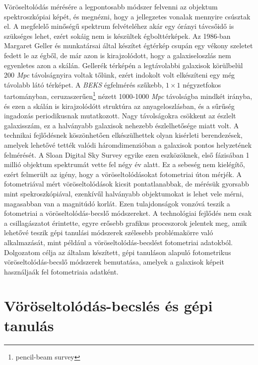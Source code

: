 \documentclass[12pt,letterpaper,twoside,openright]{book}
\begin{document}
Vöröseltolódás mérésére a legpontosabb módszer felvenni az objektum spektroszkópiai képét, és megnézni, hogy a jellegzetes vonalak mennyire csúsztak el. A megfelelő minőségű spektrum felvételéhez akár egy órányi távcsőidő is szükséges lehet, ezért sokáig nem is készültek égbolttérképek. Az 1986-ban Margaret Geller és munkatársai által készítet égtérkép csupán egy vékony szeletet fedett le az égből, de már azon is kirajzolódott, hogy a galaxiseloszlás nem egyenletes azon a skálán. Gellerék térképén a legtávolabbi galaxisok körülbelül 200 \textit{Mpc} távolságnyira voltak tőlünk, ezért indokolt volt elkészíteni egy még távolabb látó térképet. A \textit{BEKS} égfelmérés szűkebb, $1\times 1$ négyzetfokos tartományban, ceruzaszerűen\footnote{pencil-beam survey} nézett 1000-1000 \textit{Mpc} távolságba mindkét irányba, és ezen a skálán is kirajzolódótt struktúra az anyageloszlásban, és a sűrűség ingadozás periodikusnak mutatkozott. Nagy távolságokra csökkent az észlelt galaxisszám, ez a halványabb galaxisok nehezebb észlelhetősége miatt volt. A technikai fejlődésnek köszönhetően elkészülhettek olyan kisérleti berendezések, amelyek lehetővé tették valódi háromdimenzióban a galaxisok pontos helyzetének felmérését. A Sloan Digital Sky Survey egyike ezen eszközöknek, első fázisában 1 millió objektum spektrumát vette fel négy év alatt\cite{fr}. Ez a sebeség nem kielégítő, ezért felmerült az igény, hogy a vöröseltolódásokat fotometriai úton mérjék. A fotometriával mért vöröseltolódások kicsit pontatlanabbak, de mérésük gyorsabb mint spekroszkópiával, ezenkívűl halványabb objektumokat is lehet vele mérni, magasabban van a magnitúdó korlát. Ezen tulajdonságok vonzóvá teszik a fotometriai a vöröseltolódás-becslő módszereket. A technológiai fejlődés nem csak a csillagászatot érintette, egyre erősebb grafikus proceszorok jelentek meg, amik lehetővé teszik gépi tanulási módszerek szélesebb problémakörre való alkalmazását, mint például a vöröseltolódás-becslést fotometriai adatokból.
\newline \indent
Dolgozatom célja az általam készített, gépi tanuláson alapuló fotometrikus vöröseltolódás-becslő módszerek bemutatása, amelyek a galaxisok képeit használjaák fel fotometriaia adatként. 


\chapter{Vöröseltolódás-becslés és gépi tanulás} %
\end{document}
